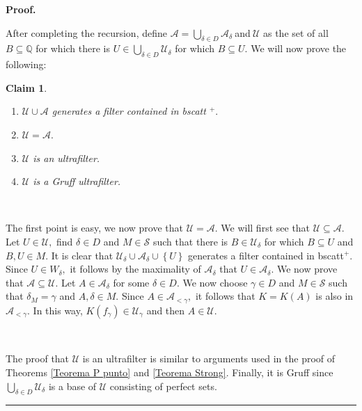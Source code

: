 \documentclass{article}%
\newtheorem{claim}[theorem]{Claim}
\newenvironment{proof}[1][Proof]{\noindent\textbf{#1.} }{\ \rule{0.5em}{0.5em}}
\begin{document}
\begin{proof}
\qquad\qquad\qquad

After completing the recursion, define $\mathcal{A=}%
{\textstyle\bigcup\limits_{\delta\in D}}
\mathcal{A}_{\delta}\ $and$\ \mathcal{U}$ as the set of all $B\subseteq
\mathbb{Q}$ for which there is $U\in%
{\textstyle\bigcup\limits_{\delta\in D}}
\mathcal{U}_{\delta}$ for which $B\subseteq U.$ We will now prove the following:

\begin{claim}
\qquad\ \ \ \qquad\ \ 

\begin{enumerate}
\item $\mathcal{U\cup A}$ generates a filter contained in \textsf{bscatt}%
$^{+}.$

\item $\mathcal{U=A}.$

\item $\mathcal{U}$ is an ultrafilter.

\item $\mathcal{U}$ is a Gruff ultrafilter.
\end{enumerate}
\end{claim}

\qquad\ \ \ \ 

The first point is easy, we now prove that $\mathcal{U=A}.$ We will first see
that $\mathcal{U\subseteq A}.$ Let $U\in\mathcal{U},$ find $\delta\in D$ and
$M\in\mathcal{S}$ such that there is $B\in\mathcal{U}_{\delta}$ for which
$B\subseteq U$ and $B,U\in M.$ It is clear that $\mathcal{U}_{\delta}%
\cup\mathcal{A}_{\delta}\cup\left\{  U\right\}  $ generates a filter contained
in \textsf{bscatt}$^{+}.$ Since $U\in W_{\delta},$ it follows by the
maximality of $\mathcal{A}_{\delta}$ that $U\in\mathcal{A}_{\delta}.$ We now
prove that $\mathcal{A\subseteq U}.$ Let $A\in\mathcal{A}_{\delta}$ for some
$\delta\in D.$ We now choose $\gamma\in D$ and $M\in\mathcal{S}$ such that
$\delta_{M}=\gamma$ and $A,\delta\in M.$ Since $A\in\mathcal{A}_{<\gamma},$ it
follows that $K=K\left(  A\right)  $ is also in $\mathcal{A}_{<\gamma}.$ In
this way, $K\left(  f_{\gamma}\right)  \in\mathcal{U}_{\gamma}$ and then
$A\in\mathcal{U}.$

\qquad\qquad\ \ 

The proof that $\mathcal{U}$ is an ultrafilter is similar to arguments used in
the proof of Theorems \ref{Teorema P punto} and \ref{Teorema Strong}. Finally,
it is Gruff since $%
{\textstyle\bigcup\limits_{\delta\in D}}
\mathcal{U}_{\delta}$ is a base of $\mathcal{U}$ consisting of perfect sets.
\end{proof}
\end{document}
